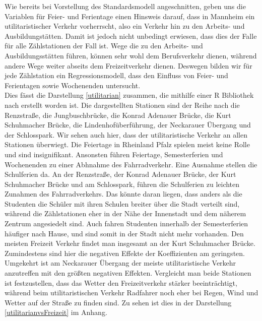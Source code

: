 \documentclass[a4paper,12pt]{thesis}
\begin{document}
Wie bereits bei Vorstellung des Standardsmodell angeschnitten, geben uns die Variablen für Feier- und Ferientage einen Hinsweis darauf, dass in Mannheim ein utilitaristischer Verkehr vorherrscht, also ein Verkehr hin zu den Arbeits- und Ausbildungstätten. Damit ist jedoch nicht unbedingt erwiesen, dass dies der Falle für alle Zählstationen der Fall ist. Wege die zu den Arbeits- und Ausbildungsstätten führen, können sehr wohl dem Berufsverkehr dienen, während andere Wege weiter abseits dem Freizeitverkehr dienen. Deswegen bilden wir für jede Zählstation ein Regressionsmodell, dass den Einfluss von Feier- und Ferientagen sowie Wochenenden untersucht.\\ 
Dies fässt die Darstellung \ref{utilitarian} zusammen, die mithilfe einer R Bibliothek nach \cite{Hlavac2022} erstellt worden ist. Die dargestellten Stationen sind der Reihe nach die Renzstraße, die Jungbuschbrücke, die Konrad Adenauer Brücke, die Kurt Schuhmacher Brücke, die Lindenhofüberführung, der Neckarauer Übergang und der Schlosspark. Wir sehen auch hier, dass der utilitaristische Verkehr an allen Stationen überwiegt. Die Feiertage in Rheinland Pfalz spielen meist keine Rolle und sind insignifikant. Ansonsten führen Feiertage, Semesterferien und Wochenenden zu einer Abhnahme des Fahrradverkehr. Eine Ausnahme stellen die Schulferien da. An der Renzstraße, der Konrad Adenauer Brücke, der Kurt Schuhmacher Brücke und am Schlosspark, führen die Schulferien zu leichten Zunahmen des Fahrradverkehrs. Das könnte daran liegen, dass anders als die Studenten die Schüler mit ihren Schulen breiter über die Stadt verteilt sind, während die Zählstationen eher in der Nähe der Innenstadt und dem näherem Zentrum angesiedelt sind. Auch fahren Studenten innerhalb der Semesterferien häufiger nach Hause, und sind somit in der Stadt nicht mehr vorhanden. Den meisten Freizeit Verkehr findet man insgesamt an der Kurt Schuhmacher Brücke. Zumindestens sind hier die negativen Effekte der Koeffizienten am geringsten. Umgekehrt ist am Neckarauer Übergang der meiste utilitaristische Verkehr anzutreffen mit den größten negativen Effekten. Vergleicht man beide Stationen ist festzustellen, dass das Wetter den Freizeitverkehr stärker beeinträchtigt, während beim utilitaristischen Verkehr Radfahrer noch eher bei Regen, Wind und Wetter auf der Straße zu finden sind. Zu sehen ist dies in der Darstellung \ref{utilitarianvsFreizeit} im Anhang.
\end{document}
